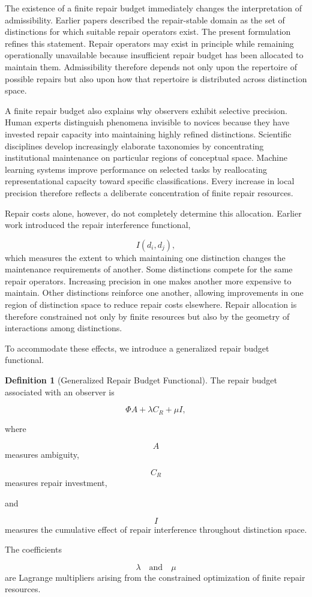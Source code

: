 \documentclass[12pt,oneside]{article}
\theoremstyle{plain}
\theoremstyle{definition}
\newtheorem{definition}[theorem]{Definition}
\theoremstyle{remark}
\begin{document}
The existence of a finite repair budget immediately changes the interpretation of admissibility. Earlier papers described the repair-stable domain as the set of distinctions for which suitable repair operators exist. The present formulation refines this statement. Repair operators may exist in principle while remaining operationally unavailable because insufficient repair budget has been allocated to maintain them. Admissibility therefore depends not only upon the repertoire of possible repairs but also upon how that repertoire is distributed across distinction space.

A finite repair budget also explains why observers exhibit selective precision. Human experts distinguish phenomena invisible to novices because they have invested repair capacity into maintaining highly refined distinctions. Scientific disciplines develop increasingly elaborate taxonomies by concentrating institutional maintenance on particular regions of conceptual space. Machine learning systems improve performance on selected tasks by reallocating representational capacity toward specific classifications. Every increase in local precision therefore reflects a deliberate concentration of finite repair resources.

Repair costs alone, however, do not completely determine this allocation. Earlier work introduced the repair interference functional,

\[
I(d_i,d_j),
\]
which measures the extent to which maintaining one distinction changes the maintenance requirements of another. Some distinctions compete for the same repair operators. Increasing precision in one makes another more expensive to maintain. Other distinctions reinforce one another, allowing improvements in one region of distinction space to reduce repair costs elsewhere. Repair allocation is therefore constrained not only by finite resources but also by the geometry of interactions among distinctions.

To accommodate these effects, we introduce a generalized repair budget functional.

\begin{definition}[Generalized Repair Budget Functional]
The repair budget associated with an observer is

\[
\Phi
A
+
\lambda C_R
+
\mu I,
\]

where

\[
A
\]
measures ambiguity,

\[
C_R
\]
measures repair investment,

and

\[
I
\]
measures the cumulative effect of repair interference throughout distinction space.

The coefficients

\[
\lambda
\quad\text{and}\quad
\mu
\]
are Lagrange multipliers arising from the constrained optimization of finite repair resources.
\end{definition}
\end{document}

